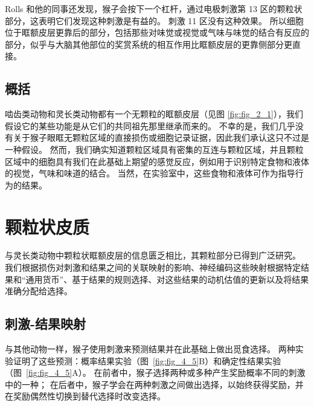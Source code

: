 Rolls 和他的同事还发现，猴子会按下一个杠杆，通过电极刺激第 13 区的颗粒状部分，这表明它们发现这种刺激是有益的\cite{mora1980electrophysiological}。
刺激 11 区没有这种效果。
所以细胞位于眶额皮层更靠后的部分，包括那些对味觉或视觉或气味与味觉的结合有反应的部分，似乎与大脑其他部位的奖赏系统的相互作用比眶额皮层的更靠侧部分更直接。\par



\subsection{概括}

啮齿类动物和灵长类动物都有一个无颗粒的眶额皮层（见图 \ref{fig:fig_2_1}），我们假设它的某些功能是从它们的共同祖先那里继承而来的。
不幸的是，我们几乎没有关于猴子眼眶无颗粒区域的直接损伤或细胞记录证据，因此我们承认这只不过是一种假设。
然而，我们确实知道颗粒区域具有密集的互连与颗粒区域，并且颗粒区域中的细胞具有我们在此基础上期望的感觉反应，例如用于识别特定食物和液体的视觉，气味和味道的结合。
当然，在实验室中，这些食物和液体可作为指导行为的结果。\par



\section{颗粒状皮质}

与灵长类动物中颗粒状眶额皮层的信息匮乏相比，其颗粒部分已得到广泛研究。
我们根据损伤对刺激和结果之间的关联映射的影响、神经编码这些映射根据特定结果和“通用货币”、基于结果的规则选择、对这些结果的动机估值的更新以及将结果准确分配给选择。



\subsection{刺激-结果映射}

与其他动物一样，猴子使用刺激来预测结果并在此基础上做出觅食选择。
两种实验证明了这些预测：概率结果实验（图~\ref{fig:fig_4_5}B）和确定性结果实验（图~\ref{fig:fig_4_5}A）。
在前者中，猴子选择两种或多种产生奖励概率不同的刺激中的一种；
在后者中，猴子学会在两种刺激之间做出选择，以始终获得奖励，并在奖励偶然性切换到替代选择时改变选择。\par


